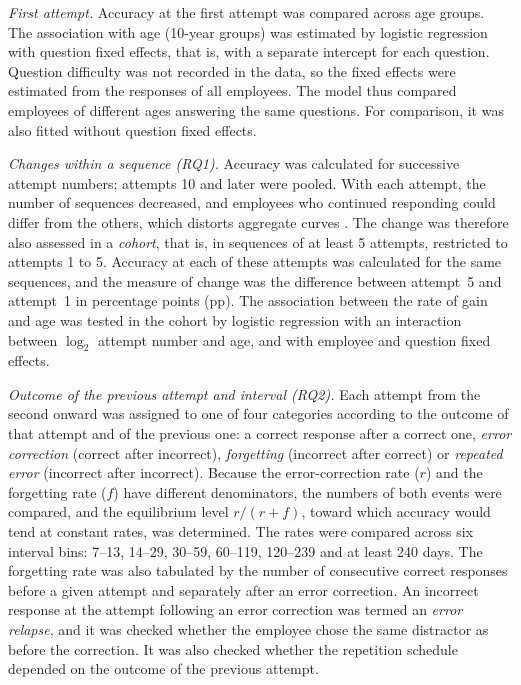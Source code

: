 \documentclass[11pt]{article}
\newcommand{\MinGapDays}{7}
\newcommand{\CohortK}{5}
\newcommand{\MaxAttemptPooled}{10}
\begin{document}
\emph{First attempt.} Accuracy at the first attempt was compared across age groups. The association
with age (10-year groups) was estimated by logistic regression with question fixed effects, that is,
with a separate intercept for each question. Question difficulty was not recorded in the data, so the
fixed effects were estimated from the responses of all employees. The model thus compared employees of
different ages answering the same questions. For comparison, it was also fitted without question fixed
effects.

\emph{Changes within a sequence (RQ1).} Accuracy was calculated for successive attempt numbers;
attempts \MaxAttemptPooled{} and later were pooled. With each attempt, the number of sequences
decreased, and employees who continued responding could differ from the others, which distorts
aggregate curves \citep{murray2013}. The change was therefore also assessed in a \emph{cohort}, that
is, in sequences of at least \CohortK{} attempts, restricted to attempts 1 to \CohortK{}. Accuracy at
each of these attempts was calculated for the same sequences, and the measure of change was the
difference between attempt~\CohortK{} and attempt~1 in percentage points (pp).
The association between the rate of gain and age was tested in the cohort by logistic regression with
an interaction between $\log_2$ attempt number and age, and with employee and question fixed effects.

\emph{Outcome of the previous attempt and interval (RQ2).} Each attempt from the second onward was
assigned to one of four categories according to the outcome of that attempt and of the previous one:
a correct response after a correct one, \emph{error correction} (correct after incorrect),
\emph{forgetting} (incorrect after correct) or \emph{repeated error} (incorrect after incorrect).
Because the error-correction rate ($r$) and the forgetting rate ($f$) have different denominators, the
numbers of both events were compared, and the equilibrium level $r/(r+f)$, toward which accuracy would
tend at constant rates, was determined. The rates were compared across six interval bins:
\MinGapDays--13, 14--29, 30--59, 60--119, 120--239 and at least 240 days. The forgetting rate was also
tabulated by the number of consecutive correct responses before a given attempt and separately after an
error correction. An incorrect response at the attempt following an error correction was termed an
\emph{error relapse}, and it was checked whether the employee chose the same distractor as before the
correction. It was also checked whether the repetition schedule depended on the outcome of the
previous attempt.
\end{document}
